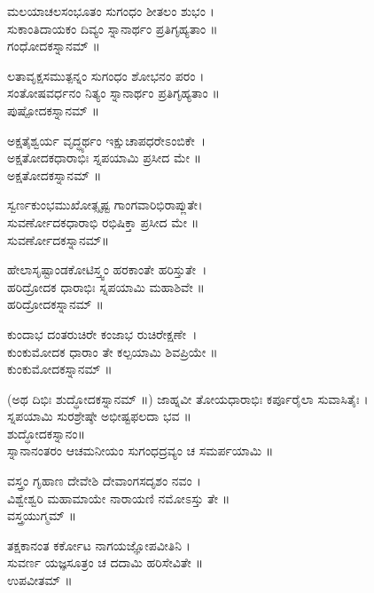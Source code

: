 ಮಲಯಾಚಲಸಂಭೂತಂ ಸುಗಂಧಂ ಶೀತಲಂ ಶುಭಂ ।\\
ಸುಕಾಂತಿದಾಯಕಂ ದಿವ್ಯಂ ಸ್ನಾನಾರ್ಥಂ ಪ್ರತಿಗೃಹ್ಯತಾಂ ॥\\
 ಗಂಧೋದಕಸ್ನಾನಮ್ ॥

ಲತಾವೃಕ್ಷಸಮುತ್ಪನ್ನಂ ಸುಗಂಧಂ ಶೋಭನಂ ಪರಂ ।\\
ಸಂತೋಷವರ್ಧನಂ ನಿತ್ಯಂ ಸ್ನಾನಾರ್ಥಂ ಪ್ರತಿಗೃಹ್ಯತಾಂ ॥ \\
ಪುಷ್ಪೋದಕಸ್ನಾನಮ್ ॥

ಅಕ್ಷತೈಶ್ವರ್ಯ ವೃದ್ಧ್ಯರ್ಥಂ ಇಕ್ಷುಚಾಪಧರೇಽಂಬಿಕೇ~।\\
ಅಕ್ಷತೋದಕಧಾರಾಭಿಃ ಸ್ನಪಯಾಮಿ ಪ್ರಸೀದ ಮೇ ॥\\
 ಅಕ್ಷತೋದಕಸ್ನಾನಮ್ ॥

ಸ್ವರ್ಣಕುಂಭಮುಖೋತ್ಸೃಷ್ಟ ಗಾಂಗವಾರಿಭಿರಾಪ್ಲುತೇ।\\
ಸುವರ್ಣೋದಕಧಾರಾಭಿ ರಭಿಷಿಕ್ತಾ ಪ್ರಸೀದ ಮೇ ॥\\
ಸುವರ್ಣೋದಕಸ್ನಾನಮ್॥

ಹೇಲಾಸೃಷ್ಟಾಂಡಕೋಟಿಸ್ತ್ವಂ ಹರಕಾಂತೇ ಹರಿಸ್ತುತೇ~।\\
ಹರಿದ್ರೋದಕ ಧಾರಾಭಿಃ ಸ್ನಪಯಾಮಿ ಮಹಾಶಿವೇ ॥\\
 ಹರಿದ್ರೋದಕಸ್ನಾನಮ್ ॥

ಕುಂದಾಭ ದಂತರುಚಿರೇ ಕಂಜಾಭ ರುಚಿರೇಕ್ಷಣೇ~।\\
ಕುಂಕುಮೋದಕ ಧಾರಾಂ ತೇ ಕಲ್ಪಯಾಮಿ ಶಿವಪ್ರಿಯೇ ॥\\
ಕುಂಕುಮೋದಕಸ್ನಾನಮ್ ॥

(ಅಥ ದಿಭಿಃ ಶುದ್ಧೋದಕಸ್ನಾನಮ್ ॥)
\newpage
ಜಾಹ್ನವೀ ತೋಯಧಾರಾಭಿಃ  ಕರ್ಪೂರೈಲಾ ಸುವಾಸಿತೈಃ ।\\
ಸ್ನಪಯಾಮಿ ಸುರಶ್ರೇಷ್ಠೇ ಅಭೀಷ್ಟಫಲದಾ ಭವ ॥\\
ಶುದ್ಧೋದಕಸ್ನಾನಂ॥\\
ಸ್ನಾನಾನಂತರಂ ಆಚಮನೀಯಂ ಸುಗಂಧದ್ರವ್ಯಂ ಚ ಸಮರ್ಪಯಾಮಿ ॥

ವಸ್ತ್ರಂ ಗೃಹಾಣ ದೇವೇಶಿ ದೇವಾಂಗಸದೃಶಂ ನವಂ ।\\
ವಿಶ್ವೇಶ್ವರಿ ಮಹಾಮಾಯೇ ನಾರಾಯಣಿ ನಮೋಽಸ್ತು ತೇ ॥\\
ವಸ್ತ್ರಯುಗ್ಮಮ್ ॥

ತಕ್ಷಕಾನಂತ ಕರ್ಕೋಟ ನಾಗಯಜ್ಞೋಪವೀತಿನಿ ।\\
ಸುವರ್ಣ ಯಜ್ಞಸೂತ್ರಂ ಚ ದದಾಮಿ ಹರಿಸೇವಿತೇ ॥\\
 ಉಪವೀತಮ್ ॥

